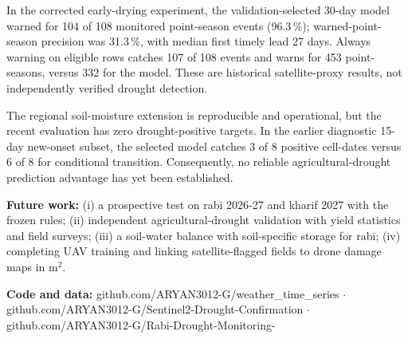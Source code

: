 \documentclass[11pt,a4paper,oneside]{article}
\begin{document}
 In the corrected early-drying experiment, the validation-selected 30-day model warned for 104 of 108 monitored point-season events (96.3\,\%); warned-point-season precision was 31.3\,\%, with median first timely lead 27 days. Always warning on eligible rows catches 107 of 108 events and warns for 453 point-seasons, versus 332 for the model. These are historical satellite-proxy results, not independently verified drought detection.

The regional soil-moisture extension is reproducible and operational, but the recent evaluation has zero drought-positive targets. In the earlier diagnostic 15-day new-onset subset, the selected model catches 3 of 8 positive cell-dates versus 6 of 8 for conditional transition. Consequently, no reliable agricultural-drought prediction advantage has yet been established.

\textbf{Future work:} (i) a prospective test on rabi 2026-27 and kharif 2027 with the frozen rules; (ii) independent agricultural-drought validation with yield statistics and field surveys; (iii) a soil-water balance with soil-specific storage for rabi; (iv) completing UAV training and linking satellite-flagged fields to drone damage maps in m$^2$.

\textbf{Code and data:} github.com/ARYAN3012-G/weather\_time\_series $\cdot$ github.com/ARYAN3012-G/Sentinel2-Drought-Confirmation $\cdot$ github.com/ARYAN3012-G/Rabi-Drought-Monitoring-

\end{document}
